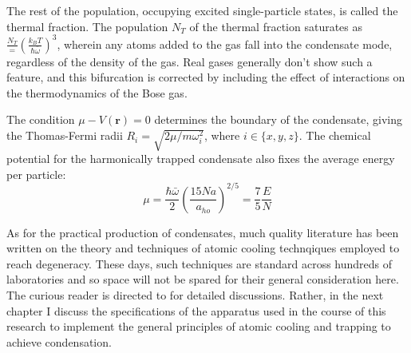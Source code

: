 	The rest of the population, occupying excited single-particle states, is called the thermal fraction.
	The population $N_T$ of the thermal fraction saturates as $\frac{N_T} = \left(\frac{k_B T}{\hbar \bar{\omega}}\right)^3$, wherein any atoms added to the gas fall into the condensate mode, regardless of the density of the gas.
	Real gases generally don't show such a feature, and this bifurcation is corrected by including the effect of interactions on the thermodynamics of the Bose gas.	 

	The condition $\mu-V(\textbf{r})=0$ determines the boundary of the condensate, giving the Thomas-Fermi radii $R_i = \sqrt{2\mu/m \omega_i^2}$, where $i\in\{x,y,z\}$.
	The chemical potential for the harmonically trapped condensate also fixes the average energy per particle:
	\begin{equation}
		\mu = \frac{\hbar\bar{\omega}}{2}\left(\frac{15 N a}{a_{ho}}\right)^{2/5} = \frac{7}{5}\frac{E}{N}
	\end{equation}

	As for the practical production of condensates, much quality literature has been written on the theory and techniques of atomic cooling technqiques employed to reach degeneracy.
	These days, such techniques are standard across hundreds of laboratories and so space will not be spared for their general consideration here.
	The curious reader is directed to \cite{MakingProbingUnderstanding,courtielle01,MetVdS, tychkovThesis} for detailed discussions.
	 Rather, in the next chapter I discuss the specifications of the apparatus used in the course of this research to implement the general principles of atomic cooling and trapping to achieve condensation.
	




